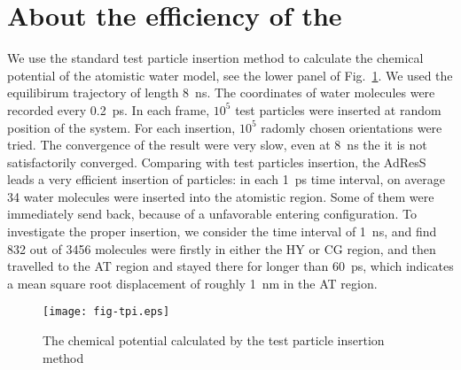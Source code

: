 \documentclass[aip,jcp,a4paper,reprint,onecolumn]{revtex4-1}
\begin{document}
\section{About the efficiency of the }

We use the standard test particle insertion method to calculate the
chemical potential of the atomistic water model, see the lower panel
of Fig.~\ref{fig:tmp4}. We used the equilibirum trajectory of length
8~\textsf{ns}. The coordinates of water molecules were recorded every
0.2~\textsf{ps}.  In each frame, $10^5$ test particles were inserted
at random position of the system. For each insertion, $10^5$ radomly
chosen orientations were tried. The convergence of the result were very
slow, even at 8~\textsf{ns} the it is not satisfactorily converged.
Comparing with test particles insertion, the AdResS leads a very
efficient insertion of particles: in each 1~\textsf{ps} time interval,
on average 34 water molecules were inserted into the atomistic region. Some of
them were immediately send back, because of a unfavorable entering
configuration.  To investigate the proper insertion, we consider the
time interval of 1~\textsf{ns}, and find 832 out of 3456 molecules
were firstly in either the HY or CG region, and then travelled to the
AT region and stayed there for longer than 60~\textsf{ps}, which
indicates a mean square root displacement of roughly 1~\textsf{nm}
in the AT region.


\begin{figure}
  \centering
  \texttt{[image: fig-tpi.eps]}
  \caption{The chemical potential calculated by the test particle insertion method}
  \label{fig:tmp4}
\end{figure}
\end{document}
